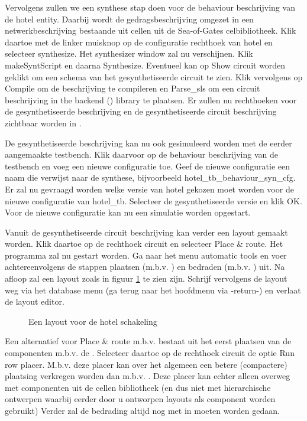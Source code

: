 Vervolgens zullen we een synthese stap doen voor de behaviour beschrijving van 
de hotel entity.
Daarbij wordt de gedragsbeschrijving omgezet in een
netwerkbeschrijving bestaande uit cellen uit de Sea-of-Gates celbibliotheek.
Klik daartoe met de linker muisknop op de configuratie rechthoek van hotel
en selecteer synthesize.
Het synthesizer window zal nu verschijnen.
Klik makeSyntScript en daarna Synthesize.
Eventueel kan op Show circuit worden geklikt om een schema van het 
gesynthetiseerde circuit te zien.
Klik vervolgens op Compile om de  beschrijving
te compileren en Parse\_sls om een  circuit beschrijving 
in the backend () library te plaatsen.
Er zullen nu rechthoeken voor de gesynthetiseerde  beschrijving en
de gesynthetiseerde circuit beschrijving zichtbaar worden in .

De gesynthetiseerde  beschrijving kan nu ook gesimuleerd worden
met de eerder aangemaakte testbench.
Klik daarvoor op de behaviour beschrijving van de testbench en voeg een
nieuwe configuratie toe.
Geef de nieuwe configuratie een naam die verwijst naar de synthese,
bijvoorbeeld hotel\_tb\_behaviour\_syn\_cfg.
Er zal nu gevraagd worden welke versie van hotel gekozen moet worden 
voor de nieuwe configuratie van hotel\_tb.
Selecteer de gesynthetiseerde versie en klik OK.
Voor de nieuwe configuratie kan nu een simulatie worden opgestart.

Vanuit de gesynthetiseerde circuit beschrijving kan verder een layout gemaakt worden.
Klik daartoe op de rechthoek circuit en selecteer Place \& route.
Het programma  zal nu gestart worden.
Ga naar het menu automatic tools en voer achtereenvolgens de stappen
plaatsen (m.b.v. ) en bedraden 
(m.b.v. ) uit.
Na afloop zal een layout zoals in figuur \ref{hotelseadali} te zien zijn.
Schrijf vervolgens de layout weg via het database menu 
(ga terug naar het hoofdmenu via -return-)
en verlaat de layout editor.
\begin{figure}[htbp]
  \centerline{}
  \caption{Een layout voor de hotel schakeling}
  \label{hotelseadali}
\end{figure}

Een alternatief voor Place \& route m.b.v. 
bestaat uit het eerst plaatsen van de componenten m.b.v. de .
Selecteer daartoe op de rechthoek circuit de optie Run row placer.
M.b.v. deze placer kan over het algemeen een betere (compactere) plaatsing
verkregen worden dan m.b.v. .
Deze placer kan echter alleen overweg met componenten uit de cellen bibliotheek
(en dus niet met hierarchische ontwerpen waarbij eerder door u ontworpen layouts
als component worden gebruikt)
Verder zal de bedrading altijd nog met  in
 moeten worden gedaan.
 
